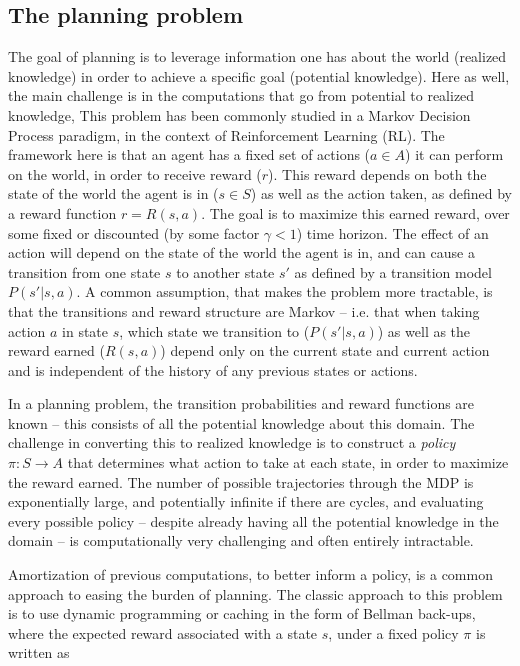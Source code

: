 \subsection*{The planning problem}

The goal of planning is to leverage information one has about the world (realized knowledge) in order to achieve a specific goal (potential knowledge). Here as well, the main challenge is in the computations that go from potential to realized knowledge, This problem has been commonly studied in a Markov Decision Process paradigm, in the context of Reinforcement Learning (RL). The framework here is that an agent has a fixed set of actions ($a \in A$) it can perform on the world, in order to receive reward ($r$). This reward depends on both the state of the world the agent is in ($s \in S$) as well as the action taken, as defined by a reward function $r = R(s, a)$. The goal is to maximize this earned reward, over some fixed or discounted (by some factor $\gamma < 1$) time horizon. The effect of an action will depend on the state of the world the agent is in, and can cause a transition from one state $s$ to another state $s'$ as defined by a transition model $P(s' | s, a)$. A common assumption, that makes the problem more tractable, is that the transitions and reward structure are Markov -- i.e. that when taking action $a$ in state $s$, which state we transition to ($P(s' | s, a)$) as well as the reward earned ($R(s,a)$) depend only on the current state and current action and is independent of the history of any previous states or actions.

In a planning problem, the transition probabilities and reward functions are known -- this consists of all the potential knowledge about this domain. The challenge in converting this to realized knowledge is to construct a \textit{policy} $\pi: S \rightarrow A$ that determines what action to take at each state, in order to maximize the reward earned. The number of possible trajectories through the MDP is exponentially large, and potentially infinite if there are cycles, and evaluating every possible policy -- despite already having all the potential knowledge in the domain -- is computationally very challenging and often entirely intractable. 

Amortization of previous computations, to better inform a policy, is a common approach to easing the burden of planning. The classic approach to this problem is to use dynamic programming or caching in the form of Bellman back-ups, where the expected reward associated with a state $s$, under a fixed policy $\pi$ is written as

